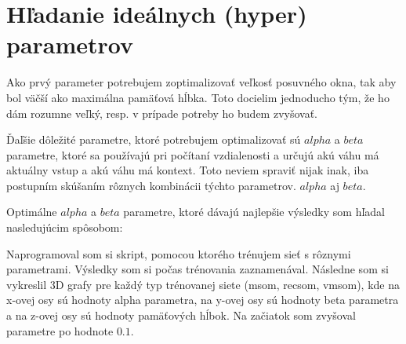 \section{Hľadanie ideálnych (hyper) parametrov}
Ako prvý parameter potrebujem zoptimalizovať veľkosť posuvného okna, tak aby bol väčší ako
maximálna pamäťová hĺbka. Toto docielim jednoducho tým, že ho dám rozumne veľký, resp. v prípade
potreby ho budem zvyšovať.

Ďaľšie dôležité parametre, ktoré potrebujem optimalizovať sú $alpha$ a $beta$ parametre, ktoré 
sa používajú pri počítaní vzdialenosti a určujú akú váhu má aktuálny vstup a akú váhu má kontext.
Toto neviem spraviť nijak inak, iba postupním skúšaním rôznych kombinácii týchto parametrov. 
$alpha$ aj $beta$.

Optimálne $alpha$ a $beta$ parametre, ktoré dávajú najlepšie výsledky som hľadal nasledujúcim
spôsobom:

Naprogramoval som si skript, pomocou ktorého trénujem sieť s rôznymi parametrami.
Výsledky som si počas trénovania zaznamenával.
Následne som si vykreslil 3D grafy pre každý typ trénovanej siete (msom, recsom, vmsom), 
kde na x-ovej osy sú hodnoty alpha parametra, na y-ovej osy sú hodnoty beta parametra a
na z-ovej osy sú hodnoty pamäťových hĺbok.
Na začiatok som zvyšoval parametre po hodnote $0.1$.








